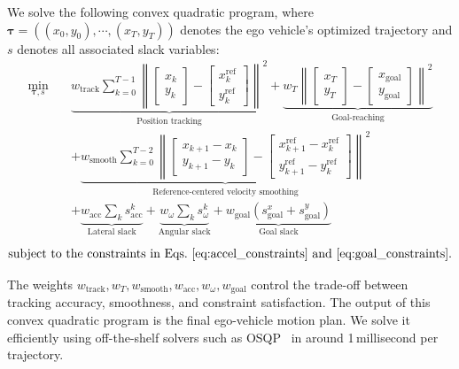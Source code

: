 \documentclass[conference]{IEEEtran}
\begin{document}
We solve the following convex quadratic program, where \(\mathbf{\tau}=((x_0, y_0), \cdots, (x_{T}, y_{T}))\) denotes the ego vehicle's optimized trajectory and \(s\) denotes all associated slack variables:
\[
\begin{aligned}
\min_{\mathbf{\tau}, s} \quad
& \underbrace{w_{\text{track}} \sum_{k=0}^{T-1} \left\|
\begin{bmatrix} x_k \\ y_k \end{bmatrix}
-
\begin{bmatrix} x^{\text{ref}}_k \\ y^{\text{ref}}_k \end{bmatrix}
\right\|^2}_{\text{Position tracking}} 
+ \underbrace{w_T \left\|
\begin{bmatrix} x_T \\ y_T \end{bmatrix}
-
\begin{bmatrix} x_{\text{goal}} \\ y_{\text{goal}} \end{bmatrix}
\right\|^2}_{\text{Goal-reaching}} \\
& + \underbrace{w_{\text{smooth}} \sum_{k=0}^{T-2} \left\|
\begin{bmatrix} x_{k+1} - x_k \\ y_{k+1} - y_k \end{bmatrix}
-
\begin{bmatrix} x^{\text{ref}}_{k+1} - x^{\text{ref}}_k \\ y^{\text{ref}}_{k+1} - y^{\text{ref}}_k \end{bmatrix}
\right\|^2}_{\text{Reference-centered velocity smoothing}} \\
& + \underbrace{w_{\text{acc}} \sum_k s_{\text{acc}}^k}_{\text{Lateral slack}} 
+ \underbrace{w_{\omega} \sum_k s_{\omega}^k}_{\text{Angular slack}} 
+ \underbrace{w_{\text{goal}} (s_{\text{goal}}^x + s_{\text{goal}}^y)}_{\text{Goal slack}}
\end{aligned}
\]
\[
\text{subject to the constraints in Eqs.~\ref{eq:accel_constraints} and~\ref{eq:goal_constraints}.}
\]

The weights \( w_{\text{track}}, w_T, w_{\text{smooth}}, w_{\text{acc}}, w_{\omega}, w_{\text{goal}} \) control the trade-off between tracking accuracy, smoothness, and constraint satisfaction. The output of this convex quadratic program is the final ego-vehicle motion plan. We solve it efficiently using off-the-shelf solvers such as OSQP~\cite{osqp} in around 1\,millisecond per trajectory.
\end{document}
